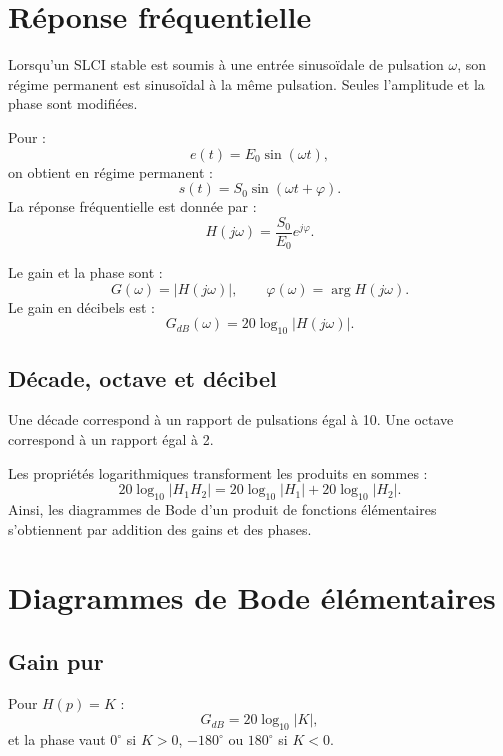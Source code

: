 
\section{Réponse fréquentielle}\label{sec:sa-frequentiel}

Lorsqu'un SLCI stable est soumis à une entrée sinusoïdale de pulsation $\omega$, son régime permanent est sinusoïdal à la même pulsation. Seules l'amplitude et la phase sont modifiées.

Pour :
\[
e(t)=E_0\sin(\omega t),
\]
on obtient en régime permanent :
\[
s(t)=S_0\sin(\omega t+\varphi).
\]
La réponse fréquentielle est donnée par :
\[
H(j\omega)=\frac{S_0}{E_0}e^{j\varphi}.
\]

\begin{SAdefinition}
Le gain et la phase sont :
\[
G(\omega)=|H(j\omega)|,
\qquad
\varphi(\omega)=\arg H(j\omega).
\]
Le gain en décibels est :
\[
G_{dB}(\omega)=20\log_{10}|H(j\omega)|.
\]
\end{SAdefinition}

\subsection{Décade, octave et décibel}

Une décade correspond à un rapport de pulsations égal à 10. Une octave correspond à un rapport égal à 2.

Les propriétés logarithmiques transforment les produits en sommes :
\[
20\log_{10}|H_1H_2|=20\log_{10}|H_1|+20\log_{10}|H_2|.
\]
Ainsi, les diagrammes de Bode d'un produit de fonctions élémentaires s'obtiennent par addition des gains et des phases.

\section{Diagrammes de Bode élémentaires}\label{sec:sa-bode-elementaire}

\subsection{Gain pur}

Pour $H(p)=K$ :
\[
G_{dB}=20\log_{10}|K|,
\]
et la phase vaut $0^\circ$ si $K>0$, $-180^\circ$ ou $180^\circ$ si $K<0$.

